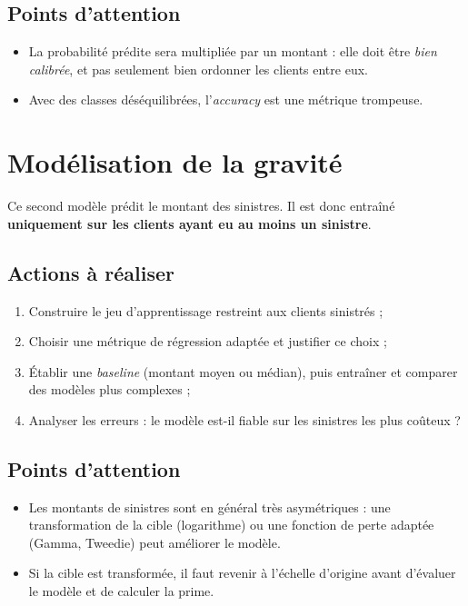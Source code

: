 \documentclass[a4paper,11pt]{article}
\begin{document}
	\subsection*{Points d'attention}
	\begin{itemize}
		\item La probabilité prédite sera multipliée par un montant : elle doit être \emph{bien calibrée}, et pas seulement bien ordonner les clients entre eux.
		\item Avec des classes déséquilibrées, l'\emph{accuracy} est une métrique trompeuse.
	\end{itemize}
	
	\section{Modélisation de la gravité}
	
	Ce second modèle prédit le montant des sinistres. Il est donc entraîné \textbf{uniquement sur les clients ayant eu au moins un sinistre}.
	
	\subsection*{Actions à réaliser}
	\begin{enumerate}
		\item Construire le jeu d'apprentissage restreint aux clients sinistrés ;
		\item Choisir une métrique de régression adaptée et justifier ce choix ;
		\item Établir une \emph{baseline} (montant moyen ou médian), puis entraîner et comparer des modèles plus complexes ;
		\item Analyser les erreurs : le modèle est-il fiable sur les sinistres les plus coûteux ?
	\end{enumerate}
	
	\subsection*{Points d'attention}
	\begin{itemize}
		\item Les montants de sinistres sont en général très asymétriques : une transformation de la cible (logarithme) ou une fonction de perte adaptée (Gamma, Tweedie) peut améliorer le modèle.
		\item Si la cible est transformée, il faut revenir à l'échelle d'origine avant d'évaluer le modèle et de calculer la prime.
	\end{itemize}
	
\end{document}
